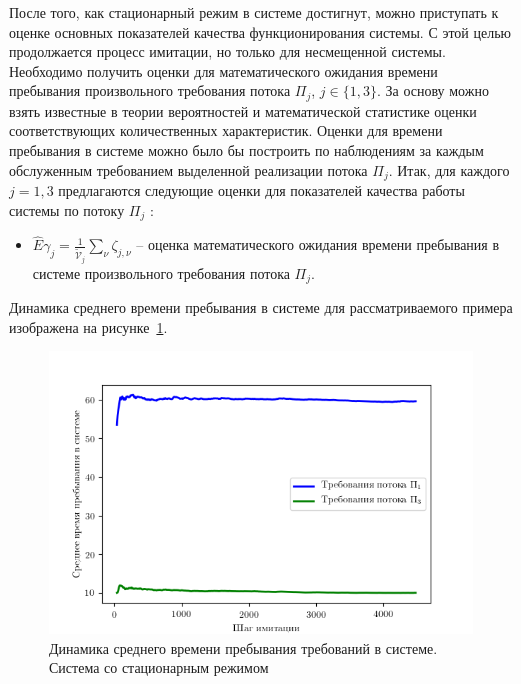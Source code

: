 После того, как стационарный режим в системе достигнут, можно приступать к оценке основных показателей качества функционирования системы. С этой целью продолжается процесс имитации, но только для несмещенной системы. Необходимо получить оценки для математического ожидания времени пребывания произвольного требования потока $\Pi_j$, $j\in \{1, 3\}$.
За основу можно взять известные в теории вероятностей и математической статистике оценки соответствующих количественных характеристик. Оценки для времени пребывания в системе можно было бы построить по наблюдениям за каждым обслуженным требованием выделенной реализации потока $\Pi_j$.
Итак, для каждого $j=1,3$  предлагаются следующие оценки для показателей качества работы системы по потоку $\Pi_j$ :
\begin{itemize}
    \item $\hat{E}\gamma_{j}=\frac{1}{\tilde{\mathcal{V}}_j}\sum_{\nu}\zeta_{j,\nu}$  -- оценка математического ожидания времени пребывания в системе произвольного требования потока $\Pi_j$.
\end{itemize}
Динамика среднего времени пребывания в системе для рассматриваемого примера изображена на рисунке~\ref{Experiment:serv:stationar}.
\begin{figure}[h]
\centering
\includegraphics[scale=1]{Dissertation/Work_structured/Pictures/pic_serv_1_stationar.png}
\caption{Динамика среднего времени пребывания требований в системе. Система со стационарным режимом}
\label{Experiment:serv:stationar}
\end{figure}
